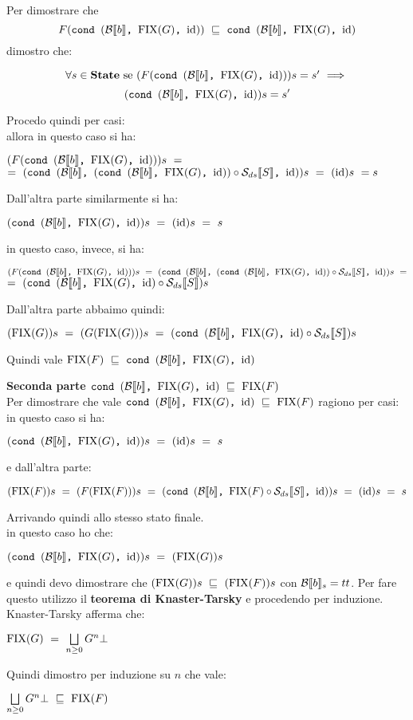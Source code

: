     Per dimostrare che \[ F(\cond{b}{\fixp{G}}{\idDS})~\mineq~
    \cond{b}{\fixp{G}}{\idDS} \]
    dimostro che:

    \[ \forall{} s\in\states$ se $(F(\cond{b}{\fixp{G}}{\idDS}))s=s'~
    \Longrightarrow~ \]\[ (\cond{b}{\fixp{G}}{\idDS})s=s' \]

    Procedo quindi per casi:\\
     allora in questo caso si ha:
    \begin{center}
    $(F(\cond{b}{\fixp{G}}{\idDS}))s~=$\\$=~
    (\cond{b}{(\cond{b}{\fixp{G}}{\idDS}) \circ{} \Sds{}}{\idDS})s~=~
    (\idDS)s~=s$
    \end{center}
    Dall'altra parte similarmente si ha:
    \begin{center}
    $(\cond{b}{\fixp{G}}{\idDS})s~=~(\idDS)s~=~s$
    \end{center}
     in questo caso, invece, si ha:
    \begin{center}
    $(F(\cond{b}{\fixp{G}}{\idDS}))s~=~(\cond{b}{(\cond{b}{\fixp{G}}{\idDS})
    \circ{} \Sds{}}{\idDS})s~=$\\$=~(\cond{b}{\fixp{G}}{\idDS} \circ{} \Sds{})s$
    \end{center}
    Dall'altra parte abbaimo quindi:
    \begin{center}
    $(\fixp{G})s~=~(G(\fixp{G}))s~=~(\cond{b}{\fixp{G}}{\idDS} \circ \Sds)s$
    \end{center}
    Quindi vale $\fixp{F}~\mineq~\cond{b}{\fixp{G}}{\idDS}$

    \textbf{Seconda parte $\cond{b}{\fixp{G}}{\idDS}~\mineq~\fixp{F}$}\\
    Per dimostrare che vale $\cond{b}{\fixp{G}}{\idDS}~\mineq~\fixp{F}$ ragiono
    per casi:\\
     in questo caso si ha:
    \begin{center}
    $(\cond{b}{\fixp{G}}{\idDS})s~=~(\idDS)s~=~s$
    \end{center}
    e dall'altra parte:
    \begin{center}
    $(\fixp{F})s~=~(F(\fixp{F}))s~=~(\cond{b}{\fixp{F} \circ{} \Sds{}}{\idDS})s
    ~=~(\idDS)s~=~s$
    \end{center}
    Arrivando quindi allo stesso stato finale.\\
     in questo caso ho che:
    \begin{center}
    $(\cond{b}{\fixp{G}}{\idDS})s~=~(\fixp{G})s$
    \end{center}
    e quindi devo dimostrare che $(\fixp{G})s~\mineq{}~(\fixp{F})s$ con
    $\evalBbs{b}{s}=tt$. Per fare questo utilizzo il \textbf{teorema di
    Knaster-Tarsky} e procedendo per induzione. Knaster-Tarsky afferma che:
    \begin{center}
    $\fixp{G}~=~\unionsem{n}G^{n}\bot$
    \end{center}
    Quindi dimostro per induzione su $n$ che vale:
    \begin{center}
    $\unionsem{n}G^{n}\bot~\mineq~\fixp{F}$
    \end{center}

